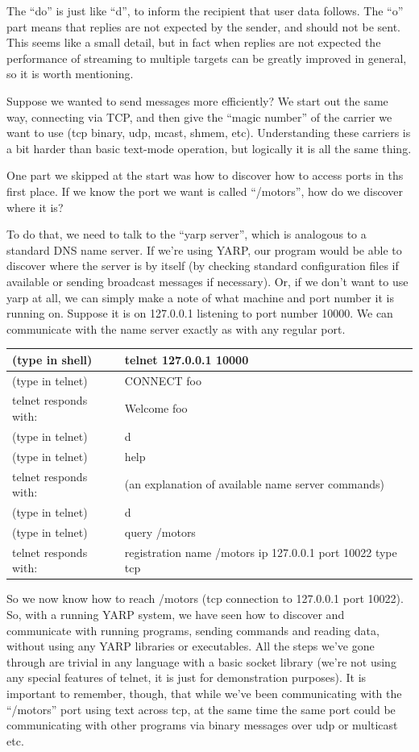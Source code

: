 The ``do'' is just like ``d'', to inform the recipient that user data
follows.  The ``o'' part means that replies are not expected by the
sender, and should not be sent.  This seems like a small detail,
but in fact when replies are not expected the performance of 
streaming to multiple targets can be greatly improved in general,
so it is worth mentioning.

Suppose we wanted to send messages more efficiently?  We start out the
same way, connecting via TCP, and then give the ``magic number'' of
the carrier we want to use (tcp binary, udp, mcast, shmem, etc).
Understanding these carriers is a bit harder than basic text-mode operation,
but logically it is all the same thing.

One part we skipped at the start was how to discover how to 
access ports in ths first place.  If we know the port we want
is called ``/motors'', how do we discover where it is?

To do that, we need to talk to the ``yarp server'', which is analogous
to a standard DNS name server.  If we're using YARP, our program would
be able to discover where the server is by itself (by checking
standard configuration files if available or sending broadcast
messages if necessary).  Or, if we don't want to use yarp at all, we
can simply make a note of what machine and port number it is running
on.  Suppose it is on 127.0.0.1 listening to port number 10000.
We can communicate with the name server exactly as with any regular
port.

\begin{tabular}{|l|p{8cm}|}
\hline
(type in shell) & telnet 127.0.0.1 10000 \\
\hline
(type in telnet) & CONNECT foo \\
\hline
telnet responds with: & Welcome foo \\
\hline
(type in telnet) & d \\
\hline
(type in telnet) & help \\
\hline
telnet responds with: & (an explanation of available name server commands) \\
\hline
(type in telnet) & d \\
\hline
(type in telnet) & query /motors \\
\hline
telnet responds with: & registration name /motors ip 127.0.0.1 port 10022 type tcp \\
\hline
\end{tabular}

So we now know how to reach /motors (tcp connection to 127.0.0.1 port 10022).
%
So, with a running YARP system, we have seen how to discover
and communicate with running programs, sending commands and reading
data, without using any YARP libraries or executables.  All the steps
we've gone through are trivial in any language with a basic socket
library (we're not using any special features of telnet, it is just
for demonstration purposes).  It is important to remember, though,
that while we've been communicating with the ``/motors'' port using
text across tcp, at the same time the same port could be communicating
with other programs via binary messages over udp or multicast etc.


